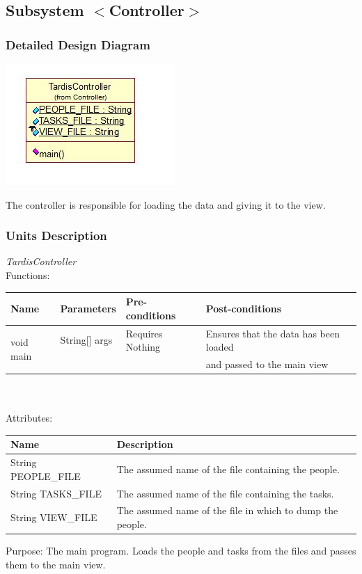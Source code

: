 \subsection{Subsystem $<$Controller$>$}

\subsubsection{Detailed Design Diagram}
\includegraphics{subsystems/diagrams/controller_class_diagram.jpg}

The controller is responsible for loading the data and giving it to the view.

\subsubsection{Units Description}


\emph{TardisController}\\
Functions:\\
\begin{tabular}{| l | l | l | l |}
\hline
Name & Parameters & Pre-conditions & Post-conditions\\
\hline
\multirow{2}{*}{void main} & String[] args & Requires Nothing & Ensures that the data has been loaded\\ 
			 &  & & and passed to the main view
\\
\hline
\end{tabular}\\
\\
Attributes:\\
\begin{tabular}{| l | l |}
\hline
Name & Description\\
\hline
String PEOPLE\_FILE & The assumed name of the file containing the people.\\
\hline
String TASKS\_FILE & The assumed name of the file containing the tasks.\\
\hline
String VIEW\_FILE & The assumed name of the file in which to dump the people.\\
\hline 
\end{tabular}

Purpose: The main program. Loads the people and tasks from the files and passes them to the main view.